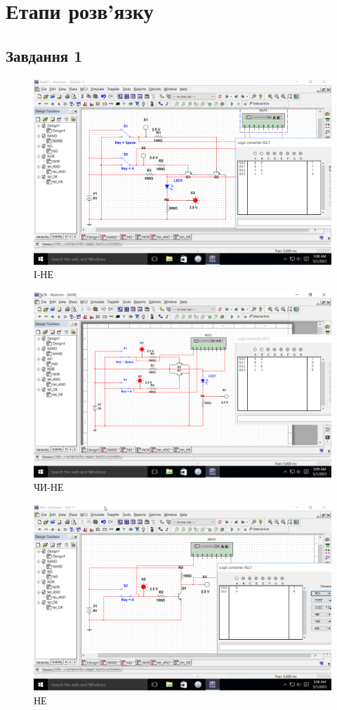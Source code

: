 \documentclass[a4paper, 12pt, oneside]{extarticle}
\begin{document}
\section*{Етапи розв'язку}

\subsection*{Завдання 1}

\begin{figure}[h]
	\includegraphics[width=\textwidth]{NAND}
	\caption{І-НЕ}
\end{figure}
\begin{figure}[h]
	\includegraphics[width=\textwidth]{NOR}
	\caption{ЧИ-НЕ}
\end{figure}
\begin{figure}[h]
	\includegraphics[width=\textwidth]{NO}
	\caption{НЕ}
\end{figure}
\end{document}
